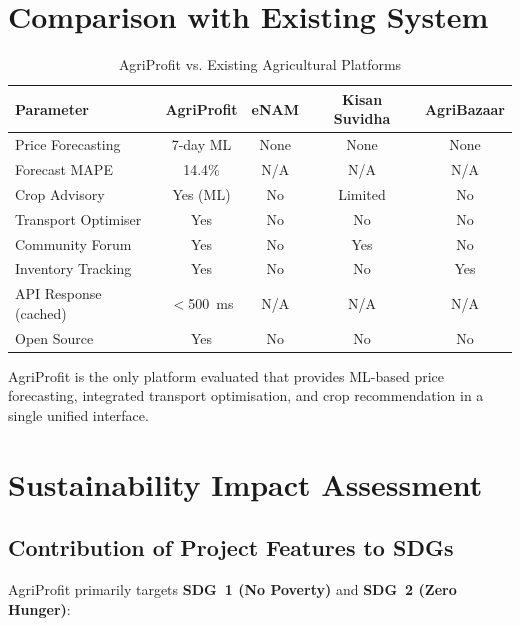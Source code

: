 \documentclass[12pt,a4paper]{report}
\begin{document}
\section{Comparison with Existing System}

\begin{table}[H]
\centering
\caption{AgriProfit vs. Existing Agricultural Platforms}
\label{tab:existingcomp}
\begin{tabular}{|l|c|c|c|c|}
\hline
\textbf{Parameter} & \textbf{AgriProfit} & \textbf{eNAM} & \textbf{Kisan Suvidha} & \textbf{AgriBazaar} \\
\hline
Price Forecasting & 7-day ML & None & None & None \\
Forecast MAPE & 14.4\% & N/A & N/A & N/A \\
Crop Advisory & Yes (ML) & No & Limited & No \\
Transport Optimiser & Yes & No & No & No \\
Community Forum & Yes & No & Yes & No \\
Inventory Tracking & Yes & No & No & Yes \\
API Response (cached) & $<$500~ms & N/A & N/A & N/A \\
Open Source & Yes & No & No & No \\
\hline
\end{tabular}
\end{table}

AgriProfit is the only platform evaluated that provides ML-based price forecasting,
integrated transport optimisation, and crop recommendation in a single unified interface.

\section{Sustainability Impact Assessment}

\subsection{Contribution of Project Features to SDGs}

AgriProfit primarily targets \textbf{SDG~1 (No Poverty)} and \textbf{SDG~2 (Zero Hunger)}:
\end{document}
